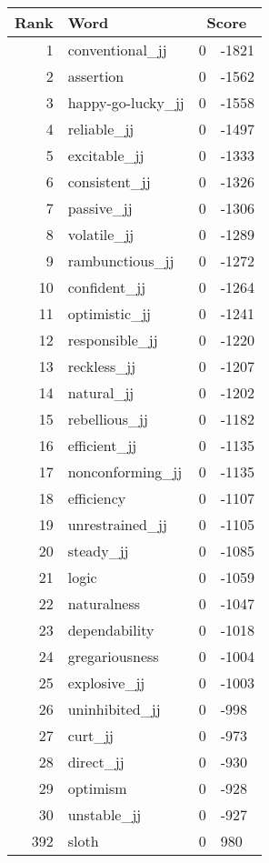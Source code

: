 \begin{longtable}[!htbp]{| rlr@{.}l |}
    \hline
    \textbf{Rank} & \textbf{Word} & \multicolumn{2}{c|}{\textbf{Score}} \\
    \hline
    \endhead
    1 & conventional\_jj & 0 & -1821 \\
    2 & assertion & 0 & -1562 \\
    3 & happy-go-lucky\_jj & 0 & -1558 \\
    4 & reliable\_jj & 0 & -1497 \\
    5 & excitable\_jj & 0 & -1333 \\
    6 & consistent\_jj & 0 & -1326 \\
    7 & passive\_jj & 0 & -1306 \\
    8 & volatile\_jj & 0 & -1289 \\
    9 & rambunctious\_jj & 0 & -1272 \\
    10 & confident\_jj & 0 & -1264 \\
    11 & optimistic\_jj & 0 & -1241 \\
    12 & responsible\_jj & 0 & -1220 \\
    13 & reckless\_jj & 0 & -1207 \\
    14 & natural\_jj & 0 & -1202 \\
    15 & rebellious\_jj & 0 & -1182 \\
    16 & efficient\_jj & 0 & -1135 \\
    17 & nonconforming\_jj & 0 & -1135 \\
    18 & efficiency & 0 & -1107 \\
    19 & unrestrained\_jj & 0 & -1105 \\
    20 & steady\_jj & 0 & -1085 \\
    21 & logic & 0 & -1059 \\
    22 & naturalness & 0 & -1047 \\
    23 & dependability & 0 & -1018 \\
    24 & gregariousness & 0 & -1004 \\
    25 & explosive\_jj & 0 & -1003 \\
    26 & uninhibited\_jj & 0 & -998 \\
    27 & curt\_jj & 0 & -973 \\
    28 & direct\_jj & 0 & -930 \\
    29 & optimism & 0 & -928 \\
    30 & unstable\_jj & 0 & -927 \\
    392 & sloth & 0 & 980 \\

\end{longtable}
